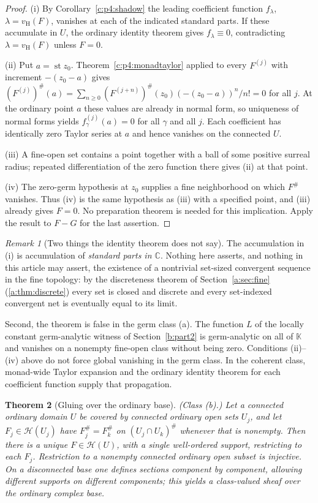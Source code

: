 \documentclass[11pt,a4paper]{article}
\numberwithin{equation}{section}
\newtheorem{theorem}{Theorem}[section]
\theoremstyle{definition}
\theoremstyle{remark}
\newtheorem{remark}[theorem]{Remark}
\theoremstyle{plain}
\newcommand{\K}{\mathbb K}
\newcommand{\CC}{\mathbb C}
\DeclareMathOperator{\st}{st}
\newcommand{\halo}[1]{#1^{\#}}
\newcommand{\ev}[1]{#1^{\#}}
\newcommand{\Hc}{\mathcal H}
\newcommand{\vH}{v_{\mathrm H}}
\begin{document}
\begin{proof}
(i) By Corollary~\ref{c:p4:shadow} the leading coefficient function
$f_\lambda$, $\lambda=\vH(F)$, vanishes at each of the indicated
standard parts. If these accumulate in $U$, the ordinary identity
theorem gives $f_\lambda\equiv0$, contradicting $\lambda=\vH(F)$ unless
$F=0$.

(ii) Put $a=\st z_0$. Theorem~\ref{c:p4:monadtaylor} applied to every
$F^{(j)}$ with increment $-(z_0-a)$ gives
$\ev{(F^{(j)})}(a)=\sum_{n\ge0}\ev{(F^{(j+n)})}(z_0)(-(z_0-a))^n/n!=0$
for all $j$. At the ordinary point $a$ these values are already in
normal form, so uniqueness of normal forms yields
$f_\gamma^{(j)}(a)=0$ for all $\gamma$ and all $j$. Each coefficient has
identically zero Taylor series at $a$ and hence vanishes on the
connected $U$.

(iii) A fine-open set contains a point together with a ball of some
positive surreal radius; repeated differentiation of the zero function
there gives (ii) at that point.

(iv) The zero-germ hypothesis at $z_0$ supplies a fine neighborhood
on which $\ev F$ vanishes. Thus (iv) is the same hypothesis
as (iii) with a specified point, and (iii) already gives $F=0$.
No preparation theorem is needed for this implication. Apply the result to $F-G$ for the last assertion.
\end{proof}

\begin{remark}[Two things the identity theorem does not say]
\label{c:p4:rk-identity}
The accumulation in (i) is accumulation of \emph{standard parts in
$\CC$}. Nothing here asserts, and nothing in this article may assert,
the existence of a nontrivial set-sized convergent sequence in the fine
topology: by the discreteness theorem of Section~\ref{a:sec:fine}
(\ref{a:thm:discrete}) every set is closed and discrete and every
set-indexed convergent net is eventually equal to its limit.

Second, the theorem is false in the germ class (a). The function $L$ of
the locally constant germ-analytic witness of Section~\ref{b:part2} is germ-analytic on all of $\K$ and vanishes on a
nonempty fine-open class without being zero. Conditions (ii)--(iv) above
do not force global vanishing in the germ class. In the coherent class,
monad-wide Taylor expansion and the ordinary identity theorem for each
coefficient function supply that propagation.
\end{remark}

\begin{theorem}[Gluing over the ordinary base]\label{c:p4:gluing}
\emph{(Class (b).)} Let a connected ordinary domain $U$ be covered by
connected ordinary open sets $U_j$, and let $F_j\in\Hc(U_j)$ have
$\ev{F_j}=\ev{F_k}$ on $\halo{(U_j\cap U_k)}$ whenever that is nonempty.
Then there is a unique $F\in\Hc(U)$, with a single well-ordered support,
restricting to each $F_j$. Restriction to a nonempty connected ordinary
open subset is injective. On a disconnected base one defines sections
component by component, allowing \emph{different supports on different
components}; this yields a class-valued sheaf over the ordinary complex
base.
\end{theorem}
\end{document}
